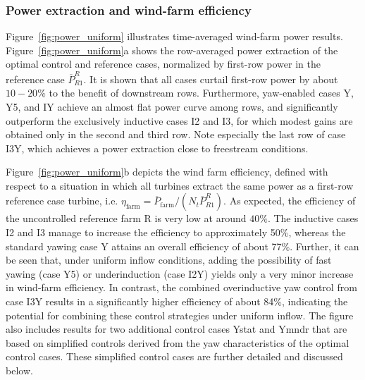 \documentclass[energies,article,submit,moreauthors,latex,10pt,a4paper]{mdpi}
\begin{document}
\subsubsection{Power extraction and wind-farm efficiency}\label{subsec:uni_powerextr}
\noindent Figure~\ref{fig:power_uniform} illustrates time-averaged wind-farm power results. Figure~\ref{fig:power_uniform}a shows the row-averaged power extraction of the optimal control and reference cases, normalized by first-row power in the reference case $\overline{P}_{R1}^R$. It is shown that all cases curtail first-row power by about $10-20\%$ to the benefit of downstream rows. Furthermore, yaw-enabled cases Y, Y5, and IY achieve an almost flat power curve among rows, and significantly outperform the exclusively inductive cases I2 and I3, for which modest gains are obtained only in the second and third row. Note especially the last row of case I3Y, which achieves a power extraction close to freestream conditions.

Figure~\ref{fig:power_uniform}b depicts the wind farm efficiency, defined with respect to a situation in which all turbines extract the same power as a first-row reference case turbine, i.e. $\eta_{\text{farm}} = \overline{P}_{\text{farm}}/(N_t \overline{P}_{R1}^{R})$. As expected, the efficiency of the uncontrolled reference farm R is very low at around $40\%$. The inductive cases I2 and I3 manage to increase the efficiency to approximately 50\%, whereas the standard yawing case Y attains an overall efficiency of about 77$\%$. Further, it can be seen that, under uniform inflow conditions, adding the possibility of fast yawing (case Y5) or underinduction (case I2Y) yields only a very minor increase in wind-farm efficiency. In contrast, the combined overinductive yaw control from case I3Y results in a significantly higher efficiency of about 84\%, indicating the potential for combining these control strategies under uniform inflow. The figure also includes results for two additional control cases Ystat and Ymndr that are based on simplified controls derived from the yaw characteristics of the optimal control cases. These simplified control cases are further detailed and discussed below.
\end{document}
